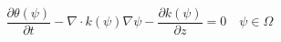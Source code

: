 \begin{equation}
\label{eq:richards-mixed}
    \frac{\partial \theta(\psi)}{\partial t} - \nabla \cdot k(\psi) \nabla \psi - \frac{\partial k(\psi)}{\partial z} = 0
    \quad \psi \in \Omega
\end{equation}
